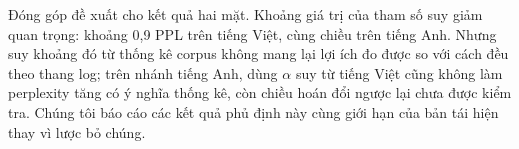 \documentclass[11pt]{article}
\begin{document}
Đóng góp đề xuất cho kết quả hai mặt. Khoảng giá trị của tham số suy giảm quan
trọng: khoảng 0,9 PPL trên tiếng Việt, cùng chiều trên tiếng Anh. Nhưng suy
khoảng đó từ thống kê corpus không mang lại lợi ích đo được so với cách đều theo
thang log; trên nhánh tiếng Anh, dùng $\alpha$ suy từ tiếng Việt cũng không làm
perplexity tăng có ý nghĩa thống kê, còn chiều hoán đổi ngược lại chưa được kiểm tra.
Chúng tôi báo cáo các kết quả phủ định này cùng giới hạn của bản tái hiện thay
vì lược bỏ chúng.

%
%
%
\clearpage

\end{document}
